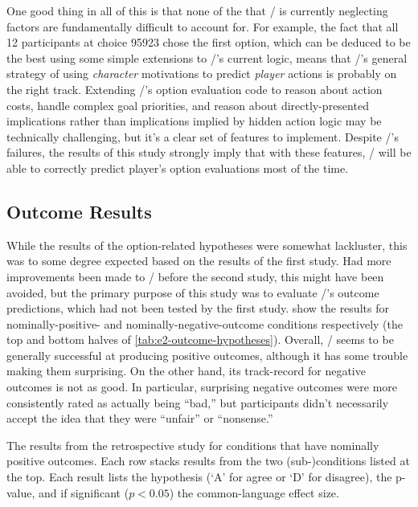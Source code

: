 One good thing in all of this is that none of the that \dunyazad/ is currently neglecting factors are fundamentally difficult to account for.
%
For example, the fact that all 12 participants at choice 95923 chose the first option, which can be deduced to be the best using some simple extensions to \dunyazad/'s current logic, means that \dunyazad/'s general strategy of using \emph{character} motivations to predict \emph{player} actions is probably on the right track.
%
Extending \dunyazad/'s option evaluation code to reason about action costs, handle complex goal priorities, and reason about directly-presented implications rather than implications implied by hidden action logic may be technically challenging, but it's a clear set of features to implement.
%
Despite \dunyazad/'s failures, the results of this study strongly imply that with these features, \dunyazad/ will be able to correctly predict player's option evaluations most of the time.


\subsection{Outcome Results}

While the results of the option-related hypotheses were somewhat lackluster, this was to some degree expected based on the results of the first study.
%
Had more improvements been made to \dunyazad/ before the second study, this might have been avoided, but the primary purpose of this study was to evaluate \dunyazad/'s outcome predictions, which had not been tested by the first study.
%
 show the results for nominally-positive- and nominally-negative-outcome conditions respectively (the top and bottom halves of \cref{tab:e2-outcome-hypotheses}).
%
Overall, \dunyazad/ seems to be generally successful at producing positive outcomes, although it has some trouble making them surprising.
%
On the other hand, its track-record for negative outcomes is not as good.
%
In particular, surprising negative outcomes were more consistently rated as actually being ``bad,'' but participants didn't necessarily accept the idea that they were ``unfair'' or ``nonsense.''

\begin{table}[!p]
\centering
\bgroup
\def\arraystretch{1.3}
\setlength{\tabcolsep}{0.4em}

\egroup
\caption[Retrospective positive outcome results]{The results from the retrospective study for conditions that have nominally positive outcomes. Each row stacks results from the two (sub-)conditions listed at the top. Each result lists the hypothesis (`A' for agree or `D' for disagree), the p-value, and if significant ($p < 0.05$) the common-language effect size.}
  \label{tab:e2-positive-outcome-results}
\end{table}

